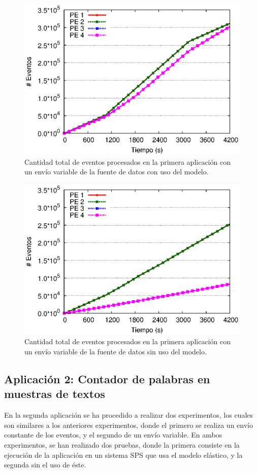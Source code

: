 \begin{figure}[!ht]
\centering
    \includegraphics[scale=0.7]{images/exp/app1/normal/cm/eventCount.eps}
    \caption{Cantidad total de eventos procesados en la primera aplicación con un envío variable de la fuente de datos con uso del modelo.}
    \label{fig:app1-normal-eventCount-cm}
\end{figure}

\begin{figure}[!ht]
\centering
    \includegraphics[scale=0.7]{images/exp/app1/normal/sm/eventCount.eps}
    \caption{Cantidad total de eventos procesados en la primera aplicación con un envío variable de la fuente de datos sin uso del modelo.}
    \label{fig:app1-normal-eventCount-sm}
\end{figure}

\subsection{Aplicación 2: Contador de palabras en muestras de textos}
En la segunda aplicación se ha procedido a realizar dos experimentos, los cuales son similares a los anteriores experimentos, donde el primero se realiza un envío constante de los eventos, y el segundo de un envío variable. En ambos experimentos, se han realizado dos pruebas, donde la primera consiste en la ejecución de la aplicación en un sistema SPS que usa el modelo elástico, y la segunda sin el uso de éste.

